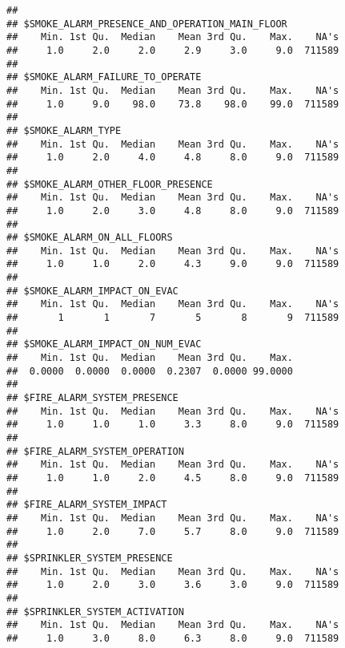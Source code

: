 \documentclass[]{article}
\begin{document}
\begin{verbatim}
## 
## $SMOKE_ALARM_PRESENCE_AND_OPERATION_MAIN_FLOOR
##    Min. 1st Qu.  Median    Mean 3rd Qu.    Max.    NA's 
##     1.0     2.0     2.0     2.9     3.0     9.0  711589 
## 
## $SMOKE_ALARM_FAILURE_TO_OPERATE
##    Min. 1st Qu.  Median    Mean 3rd Qu.    Max.    NA's 
##     1.0     9.0    98.0    73.8    98.0    99.0  711589 
## 
## $SMOKE_ALARM_TYPE
##    Min. 1st Qu.  Median    Mean 3rd Qu.    Max.    NA's 
##     1.0     2.0     4.0     4.8     8.0     9.0  711589 
## 
## $SMOKE_ALARM_OTHER_FLOOR_PRESENCE
##    Min. 1st Qu.  Median    Mean 3rd Qu.    Max.    NA's 
##     1.0     2.0     3.0     4.8     8.0     9.0  711589 
## 
## $SMOKE_ALARM_ON_ALL_FLOORS
##    Min. 1st Qu.  Median    Mean 3rd Qu.    Max.    NA's 
##     1.0     1.0     2.0     4.3     9.0     9.0  711589 
## 
## $SMOKE_ALARM_IMPACT_ON_EVAC
##    Min. 1st Qu.  Median    Mean 3rd Qu.    Max.    NA's 
##       1       1       7       5       8       9  711589 
## 
## $SMOKE_ALARM_IMPACT_ON_NUM_EVAC
##    Min. 1st Qu.  Median    Mean 3rd Qu.    Max. 
##  0.0000  0.0000  0.0000  0.2307  0.0000 99.0000 
## 
## $FIRE_ALARM_SYSTEM_PRESENCE
##    Min. 1st Qu.  Median    Mean 3rd Qu.    Max.    NA's 
##     1.0     1.0     1.0     3.3     8.0     9.0  711589 
## 
## $FIRE_ALARM_SYSTEM_OPERATION
##    Min. 1st Qu.  Median    Mean 3rd Qu.    Max.    NA's 
##     1.0     1.0     2.0     4.5     8.0     9.0  711589 
## 
## $FIRE_ALARM_SYSTEM_IMPACT
##    Min. 1st Qu.  Median    Mean 3rd Qu.    Max.    NA's 
##     1.0     2.0     7.0     5.7     8.0     9.0  711589 
## 
## $SPRINKLER_SYSTEM_PRESENCE
##    Min. 1st Qu.  Median    Mean 3rd Qu.    Max.    NA's 
##     1.0     2.0     3.0     3.6     3.0     9.0  711589 
## 
## $SPRINKLER_SYSTEM_ACTIVATION
##    Min. 1st Qu.  Median    Mean 3rd Qu.    Max.    NA's 
##     1.0     3.0     8.0     6.3     8.0     9.0  711589
\end{verbatim}
\end{document}
